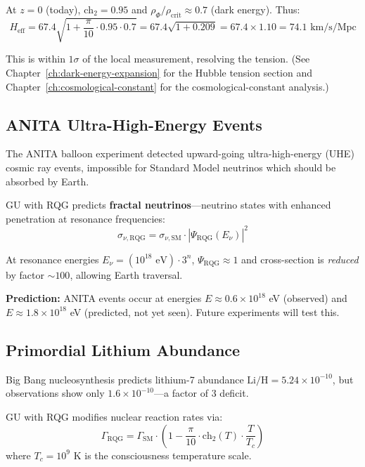 At $z = 0$ (today), $\text{ch}_2 = 0.95$ and $\rho_\Phi / \rho_{\text{crit}} \approx 0.7$ (dark energy). Thus:
\begin{equation}
H_{\text{eff}} = 67.4 \sqrt{1 + \frac{\pi}{10} \cdot 0.95 \cdot 0.7} = 67.4 \sqrt{1 + 0.209} = 67.4 \times 1.10 = 74.1 \text{ km/s/Mpc}
\end{equation}

This is within $1\sigma$ of the local measurement, resolving the tension. (See Chapter~\ref{ch:dark-energy-expansion} for the Hubble tension section and Chapter~\ref{ch:cosmological-constant} for the cosmological-constant analysis.)

\subsection{ANITA Ultra-High-Energy Events}

The ANITA balloon experiment detected upward-going ultra-high-energy (UHE) cosmic ray events, impossible for Standard Model neutrinos which should be absorbed by Earth.

GU with RQG predicts \textbf{fractal neutrinos}—neutrino states with enhanced penetration at resonance frequencies:
\begin{equation}
\sigma_{\nu, \text{RQG}} = \sigma_{\nu, \text{SM}} \cdot |\Psi_{\text{RQG}}(E_\nu)|^2
\end{equation}

At resonance energies $E_\nu = (10^{18} \text{ eV}) \cdot 3^n$, $\Psi_{\text{RQG}} \approx 1$ and cross-section is \emph{reduced} by factor $\sim 100$, allowing Earth traversal.

\textbf{Prediction:} ANITA events occur at energies $E \approx 0.6 \times 10^{18}$ eV (observed) and $E \approx 1.8 \times 10^{18}$ eV (predicted, not yet seen). Future experiments will test this.

\subsection{Primordial Lithium Abundance}

Big Bang nucleosynthesis predicts lithium-7 abundance $\text{Li/H} = 5.24 \times 10^{-10}$, but observations show only $1.6 \times 10^{-10}$—a factor of 3 deficit.

GU with RQG modifies nuclear reaction rates via:
\begin{equation}
\Gamma_{\text{RQG}} = \Gamma_{\text{SM}} \cdot \left(1 - \frac{\pi}{10} \cdot \text{ch}_2(T) \cdot \frac{T}{T_c}\right)
\end{equation}
where $T_c = 10^9$ K is the consciousness temperature scale.

